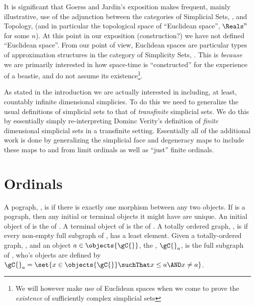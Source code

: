 It is significant that Goerss and Jardin's exposition makes frequent, mainly illustrative,
use of the adjunction between the categories of Simplicial Sets, \simpC{}, and Topology,
\topologyC{} (and in particular the topological space of ``Euclidean space'', $\Reals^{n}$
for some $n$).  At this point in our exposition (construction?) we have not defined
``Euclidean space''.  From our point of view, Euclidean spaces are particular types of
approximation structures in the category of Simplicity Sets, \simpC{}.  This is
\emph{because} we are primarily interested in how space-time is ``constructed'' for the
experience of a beastie, and do not assume its existence\footnote{We will however make use
of Euclidean spaces when we come to prove the \emph{existence} of sufficiently complex
simplicial sets}.

As stated in the introduction we are actually interested in including, at least, countably
infinite dimensional simplicies. To do this we need to generalize the usual definitions of
simplicial sets to that of \emph{transfinite} simplicial sets.  We do this by essentially
simply re-interpreting Dominc Verity's definition of \emph{finite} dimensional simplicial
sets in a transfinite setting.  Essentially all of the additional work is done by
generalizing the simplicial face and degeneracy maps to include these maps to and from
limit ordinals as well as ``just'' finite ordinals.

\section{Ordinals}

\begin{definition}
A pograph, \gC{}, is  if there is exactly one morphism between any
two objects. If \gC{} is a pograph, then any initial or terminal objects it might have are
unique. An initial object of \gC{} is the  of \gC{}. A terminal
object of \gC{} is the  of \gC{}.  A totally ordered graph,
\gC{}, is  if every non-empty full subgraph of \gC{}, has a least
element.  Given a totally-ordered graph, \gC{}, and an object $a \in \objects{\gC{}}$, the
, $\gC{}_a$, is the full subgraph of \gC{}, who's objects are defined by
$\gC{}_a = \set{x \in \objects{\gC{}} \suchThat x \leq a \AND x \neq a}$.
\end{definition}


